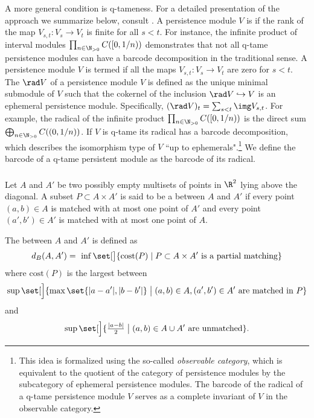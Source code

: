 A more general condition is q-tameness.
For a detailed presentation of the approach we summarize below, consult \cite{Chazal.2016a, Chazal.2016b}.
A persistence module \(V\) is  if the rank of the map \(V_{s,t} \colon V_s \to V_t\) is finite for all \(s < t\).
For instance, the infinite product of interval modules \(\prod_{n \in \N_{> 0}} C([0,1/n))\) demonstrates that not all q-tame persistence modules can have a barcode decomposition in the traditional sense.
A persistence module \(V\) is termed  if all the maps \(V_{s,t} \colon V_s \to V_t\) are zero for \(s < t\).
The  \(\rad V\) of a persistence module \(V\) is defined as the unique minimal submodule of \(V\) such that the cokernel of the inclusion \(\rad V \hookrightarrow V\) is an ephemeral persistence module.
Specifically, \((\rad V)_t = \sum_{s<t} \img V_{s,t}\).
For example, the radical of the infinite product \(\prod_{n \in \N_{> 0}} C([0, 1/n))\) is the direct sum \(\bigoplus_{n \in \N_{> 0}} C((0,1/n))\).
If \(V\) is q-tame its radical has a barcode decomposition, which describes the isomorphism type of \(V\) ``up to ephemerals".\footnote{
This idea is formalized using the so-called \textit{observable category}, which is equivalent to the quotient of the category of persistence modules by the subcategory of ephemeral persistence modules.
The barcode of the radical of a q-tame persistence module \(V\) serves as a complete invariant of \(V\) in the observable category.}
We define the barcode of a q-tame persistent module as the barcode of its radical.

\subsubsection{}
\label{ss:algebraic_stability}
Let $A$ and $A'$ be two possibly empty multisets of points in $\R^2$ lying above the diagonal.
A subset $P \subset A \times A'$ is said to be a  between $A$ and $A'$ if every point $(a, b) \in A$ is matched with at most one point of $A'$ and every point $(a', b') \in A'$ is matched with at most one point of $A$.

The  between $A$ and $A'$ is defined as
\[
d_B(A, A') = \
\inf \set[\big]{\mathrm{cost}(P) \mid P \subset A \times A' \text{ is a partial matching}}
\]
where $\mathrm{cost}(P)$ is the largest between
\[
\sup \set[\Big]{\max\set{|a - a'|, |b - b'|} \bigm| (a, b) \in A, (a', b') \in A' \text{ are matched in }P}
\]
and
\[
\sup \set[\Big]{\tfrac{ |a - b|}{2} \bigm| (a, b) \in A \cup A' \text{ are unmatched}}.
\]

